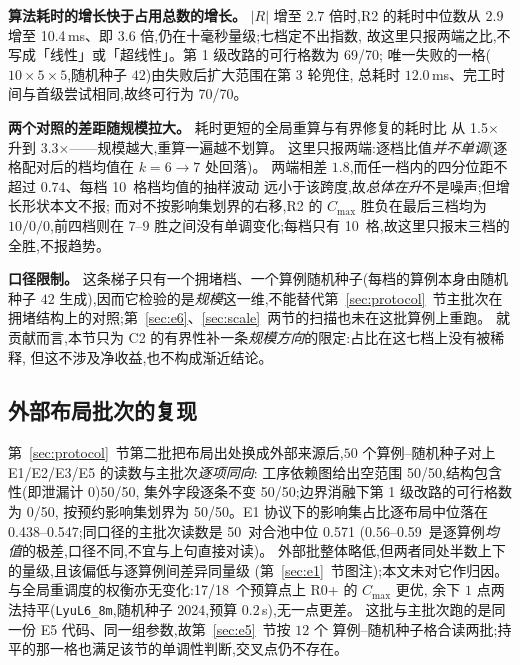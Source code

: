 \documentclass[manuscript,screen,review]{acmart}
\newcommand{\NSeeds}{10}
\newcommand{\NPairs}{50}
\newcommand{\EoneCloLo}{0.56}
\newcommand{\EoneCloHi}{0.59}
\newcommand{\EfiveCells}{12}        %
\newcommand{\EoneFracMed}{0.571}    %
\newcommand{\NPubPairs}{50}
\newcommand{\PubPassMiss}{\NPubPairs/\NPubPairs}
\newcommand{\PubFeasRone}{0/\NPubPairs}
\newcommand{\PubFeasRtwo}{\NPubPairs/\NPubPairs}
\newcommand{\PubPassClosed}{\NPubPairs/\NPubPairs}
\newcommand{\PubPassInvar}{\NPubPairs/\NPubPairs}
\newcommand{\PubEoneFracLo}{0.438}
\newcommand{\PubEoneFracHi}{0.547}
\newcommand{\PubEfiveNoCross}{17/18}
\newcommand{\ScalePairs}{70}
\newcommand{\ScaleMsHi}{10.4}        %
\newcommand{\ScaleRatioLo}{1.5}      %
\newcommand{\ScaleRatioHi}{3.3}      %
\newcommand{\ScaleFeasFirst}{69/\ScalePairs}   %
\newcommand{\ScaleFeasAll}{\ScalePairs/\ScalePairs}
\begin{document}
\textbf{算法耗时的增长快于占用总数的增长。} \(|R|\) 增至 \(2.7\) 倍时,R2 的耗时中位数从
\(2.9\) 增至 \ScaleMsHi\,ms、即 \(3.6\) 倍,仍在十毫秒量级;七档定不出指数,
故这里只报两端之比,不写成「线性」或「超线性」。第 1 级改路的可行格数为 \ScaleFeasFirst;
唯一失败的一格(\(10\times5\times5\),随机种子 \(42\))由失败后扩大范围在第 \(3\) 轮兜住,
总耗时 \(12.0\)\,ms、完工时间与首级尝试相同,故终可行为 \ScaleFeasAll。

\textbf{两个对照的差距随规模拉大。} 耗时更短的全局重算与有界修复的耗时比
从 \ScaleRatioLo\(\times\) 升到 \ScaleRatioHi\(\times\)——规模越大,重算一遍越不划算。
这里只报两端:逐档比值\emph{并不单调}(逐格配对后的档均值在 \(k=6\to 7\) 处回落)。
两端相差 \(1.8\),而任一档内的四分位距不超过 \(0.74\)、每档 \NSeeds\ 格档均值的抽样波动
远小于该跨度,故\emph{总体在升}不是噪声;但增长形状本文不报;
而对不按影响集划界的右移,R2 的 \(C_{\max}\) 胜负在最后三档均为 \(10/0/0\),前四档则在
\(7\)--\(9\) 胜之间没有单调变化;每档只有 \NSeeds\ 格,故这里只报末三档的全胜,不报趋势。

\textbf{口径限制。} 这条梯子只有一个拥堵档、一个算例随机种子(每档的算例本身由随机种子
\(42\) 生成),因而它检验的是\emph{规模}这一维,不能替代第~\ref{sec:protocol}~节主批次在
拥堵结构上的对照;第~\ref{sec:e6}、\ref{sec:scale}~两节的扫描也未在这批算例上重跑。
就贡献而言,本节只为 C2 的有界性补一条\emph{规模方向}的限定:占比在这七档上没有被稀释,
但这不涉及净收益,也不构成渐近结论。

\subsection{外部布局批次的复现}
\label{sec:pubrepro}

第~\ref{sec:protocol}~节第二批把布局出处换成外部来源后,\(\NPubPairs\) 个算例--随机种子对上
E1/E2/E3/E5 的读数与主批次\emph{逐项同向}:
工序依赖图给出空范围 \PubPassMiss,结构包含性(即泄漏计 \(0\))\PubPassClosed,
集外字段逐条不变 \PubPassInvar;边界消融下第 1 级改路的可行格数为 \PubFeasRone,
按预约影响集划界为 \PubFeasRtwo。E1 协议下的影响集占比逐布局中位落在
\PubEoneFracLo--\PubEoneFracHi;同口径的主批次读数是 \NPairs\ 对合池中位 \EoneFracMed
(\EoneCloLo--\EoneCloHi\ 是逐算例\emph{均值}的极差,口径不同,不宜与上句直接对读)。
外部批整体略低,但两者同处半数上下的量级,且该偏低与逐算例间差异同量级
(第~\ref{sec:e1}~节图注);本文未对它作归因。
与全局重调度的权衡亦无变化:\PubEfiveNoCross\ 个预算点上 R0+ 的 \(C_{\max}\) 更优,
余下 \(1\) 点两法持平(\texttt{LyuL6\_8m},随机种子 \(2024\),预算 \(0.2\)\,s),无一点更差。
这批与主批次跑的是同一份 E5 代码、同一组参数,故第~\ref{sec:e5}~节按 \(\EfiveCells\) 个
算例--随机种子格合读两批;持平的那一格也满足该节的单调性判断,交叉点仍不存在。
\end{document}
